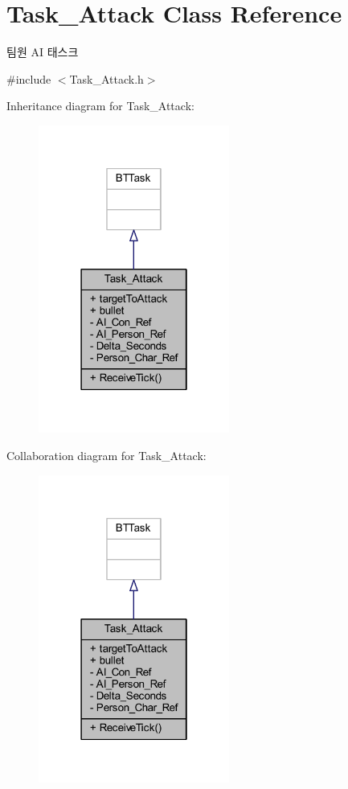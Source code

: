 \hypertarget{class_task___attack}{}\section{Task\+\_\+\+Attack Class Reference}
\label{class_task___attack}


팀원 AI 태스크  




{\ttfamily \#include $<$Task\+\_\+\+Attack.\+h$>$}



Inheritance diagram for Task\+\_\+\+Attack\+:\nopagebreak
\begin{figure}[H]
\begin{center}
\leavevmode
\includegraphics[width=178pt]{class_task___attack__inherit__graph}
\end{center}
\end{figure}


Collaboration diagram for Task\+\_\+\+Attack\+:\nopagebreak
\begin{figure}[H]
\begin{center}
\leavevmode
\includegraphics[width=178pt]{class_task___attack__coll__graph}
\end{center}
\end{figure}
